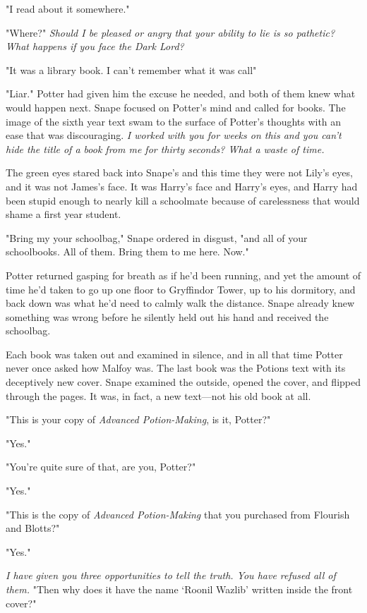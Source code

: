 "I{\el} read about it somewhere."

"Where?" \emph{Should I be pleased or angry that your ability to lie is so pathetic? What happens if you face the Dark Lord?}

"It was{\el} a library book. I can't remember what it was call{\el}"

"Liar." Potter had given him the excuse he needed, and both of them knew what would happen next. Snape focused on Potter's mind and called for books. The image of the sixth year text swam to the surface of Potter's thoughts with an ease that was discouraging. \emph{I worked with you for weeks on this and you can't hide the title of a book from me for thirty seconds? What a waste of time.}

The green eyes stared back into Snape's and this time they were not Lily's eyes, and it was not James's face. It was Harry's face and Harry's eyes, and Harry had been stupid enough to nearly kill a schoolmate because of carelessness that would shame a first year student.

"Bring my your schoolbag," Snape ordered in disgust, "and all of your schoolbooks. All of them. Bring them to me here. Now."

Potter returned gasping for breath as if he'd been running, and yet the amount of time he'd taken to go up one floor to Gryffindor Tower, up to his dormitory, and back down was what he'd need to calmly walk the distance. Snape already knew something was wrong before he silently held out his hand and received the schoolbag.

Each book was taken out and examined in silence, and in all that time Potter never once asked how Malfoy was. The last book was the Potions text with its deceptively new cover. Snape examined the outside, opened the cover, and flipped through the pages. It was, in fact, a new text—not his old book at all.

"This is your copy of \emph{Advanced Potion-Making}, is it, Potter?"

"Yes."

"You're quite sure of that, are you, Potter?"

"Yes."

"This is the copy of \emph{Advanced Potion-Making} that you purchased from Flourish and Blotts?"

"Yes."

\emph{I have given you three opportunities to tell the truth. You have refused all of them.} "Then why does it have the name `Roonil Wazlib' written inside the front cover?"

